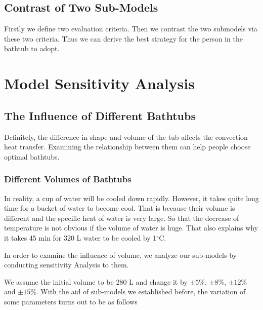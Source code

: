\documentclass{mcmthesis}
\begin{document}
\subsection{Contrast of Two Sub-Models}

Firstly we define two evaluation criteria. Then we contrast the two submodels via these two criteria. Thus we can derive the best strategy for the person in the bathtub to adopt.

\section{Model Sensitivity Analysis}

\subsection{The Influence of Different Bathtubs}

Definitely, the difference in shape and volume of the tub affects the
convection heat transfer. Examining the relationship between them can help
people choose optimal bathtubs.

\subsubsection{Different Volumes of Bathtubs}

In reality, a cup of water will be cooled down rapidly. However, it takes quite long time for a bucket of water to become cool. That is because their volume is different and the specific heat of water is very large. So that the decrease of temperature is not obvious if the volume of water is huge. That also explains why it takes 45 min for 320 L water to be cooled by 1$^\circ$C.

In order to examine the influence of volume, we analyze our sub-models
by conducting sensitivity Analysis to them.

We assume the initial volume to be 280 L and change it by $\pm 5$\%, $\pm 8$\%, $\pm 12$\% and $\pm 15$\%. With the aid of sub-models we established before, the variation of some parameters turns out to be as follows
\end{document}
